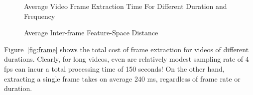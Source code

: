
\begin{figure}[t]
\begin{minipage}[t]{9cm}
    \centering {}
    \caption{Average Video Frame Extraction Time For Different Duration and Frequency}
    \label{fig:frame}
\end{minipage}
\begin{minipage}[t]{9cm}
    \centering {}
    \caption{Average Inter-frame Feature-Space Distance}
    \label{fig:similarity}
\end{minipage}
\end{figure}


Figure~\ref{fig:frame} shows the total cost of frame extraction for
videos of different durations.
%
Clearly, for long videos, even are relatively modest sampling rate of
4 fps can incur a total processing time of 150 seconds!
%
On the other hand, extracting a single frame takes on average 240 ms,
regardless of frame rate or duration.
%
%




